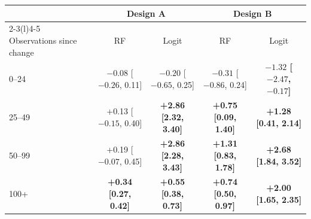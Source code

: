 \begin{tabular}{@{}lcccc@{}}
\toprule
 & \multicolumn{2}{c}{Design A} & \multicolumn{2}{c}{Design B} \\
\cmidrule(lr){2-3}\cmidrule(l){4-5}
Observations since change & RF & Logit & RF & Logit \\
\midrule
0--24 & $-0.08$ [$-0.26$, 0.11] & $-0.20$ [$-0.65$, 0.25] & $-0.31$ [$-0.86$, 0.24] & \textbf{\boldmath $-1.32$ [$-2.47$, $-0.17$]} \\
25--49 & +0.13 [$-0.15$, 0.40] & \textbf{\boldmath +2.86 [2.32, 3.40]} & \textbf{\boldmath +0.75 [0.09, 1.40]} & \textbf{\boldmath +1.28 [0.41, 2.14]} \\
50--99 & +0.19 [$-0.07$, 0.45] & \textbf{\boldmath +2.86 [2.28, 3.43]} & \textbf{\boldmath +1.31 [0.83, 1.78]} & \textbf{\boldmath +2.68 [1.84, 3.52]} \\
100+ & \textbf{\boldmath +0.34 [0.27, 0.42]} & \textbf{\boldmath +0.55 [0.38, 0.73]} & \textbf{\boldmath +0.74 [0.50, 0.97]} & \textbf{\boldmath +2.00 [1.65, 2.35]} \\
\bottomrule
\end{tabular}
